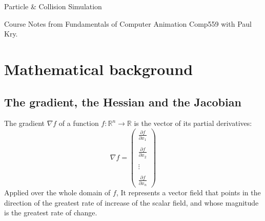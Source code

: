\documentclass{article}
\begin{document}
\centerline{\sc \large Particle \& Collision Simulation}
\centerline{Course Notes from Fundamentals of Computer Animation Comp559 with Paul Kry.}

\section{Mathematical background}
\subsection{The gradient, the Hessian and the Jacobian}
The gradient $\nabla f$ of  a function $ f: \mathbb{R}^n \longrightarrow \mathbb{R} $
is the vector of its partial derivatives:
\[
    \nabla f =
    \begin{pmatrix}
        \frac{\partial f}{\partial x_1} \\ \\
        \frac{\partial f}{\partial x_2} \\ \\
        \vdots \\ \\
        \frac{\partial f}{\partial x_n}
    \end{pmatrix}
\]
Applied over the whole domain of $f$, It represents a vector field that points in the direction of the greatest rate of increase of the scalar field,
and whose magnitude is the greatest rate of change.
\end{document}

